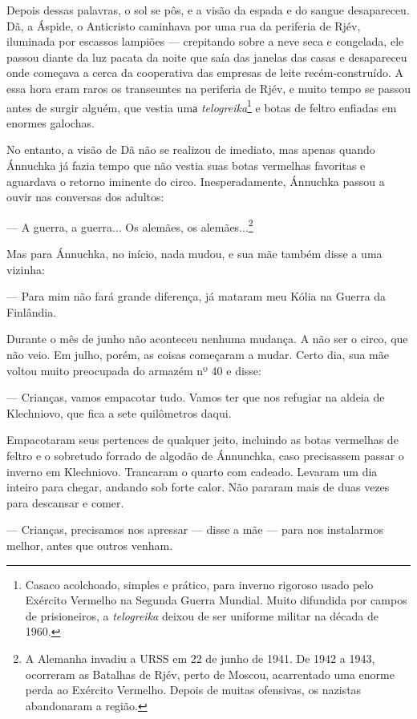 Depois dessas palavras, o sol se pôs, e a visão da espada e do sangue
desapareceu. Dã, a Áspide, o Anticristo caminhava por uma rua da
periferia de Rjév, iluminada por escassos lampiões --- crepitando sobre
a neve seca e congelada, ele passou diante da luz pacata da noite que
saía das janelas das casas e desapareceu onde começava a cerca da
cooperativa das empresas de leite recém-construído. A essa hora eram
raros os transeuntes na periferia de Rjév, e muito tempo se passou antes
de surgir alguém, que vestia umа \emph{telogreika}\footnote{Casaco
  acolchoado, simples e prático, para inverno rigoroso usado pelo
  Exército Vermelho na Segunda Guerra Mundial. Muito difundida por
  campos de prisioneiros, a \emph{telogreika} deixou de ser uniforme
  militar na década de 1960.} e botas de feltro enfiadas em enormes
galochas.

No entanto, a visão de Dã não se realizou de imediato, mas apenas quando
Ánnuchka já fazia tempo que não vestia suas botas vermelhas favoritas e
aguardava o retorno iminente do circo. Inesperadamente, Ánnuchka passou
a ouvir nas conversas dos adultos:

--- A guerra, a guerra... Os alemães, os alemães...\footnote{A Alemanha
  invadiu a URSS em 22 de junho de 1941. De 1942 a 1943, ocorreram as
  Batalhas de Rjév, perto de Moscou, acarrentado uma enorme perda ao
  Exército Vermelho. Depois de muitas ofensivas, os nazistas abandonaram
  a região.}

Mas para Ánnuchka, no início, nada mudou, e sua mãe também disse a uma
vizinha:

--- Para mim não fará grande diferença, já mataram meu Kólia na Guerra
da Finlândia.

Durante o mês de junho não aconteceu nenhuma mudança. A não ser o circo,
que não veio. Em julho, porém, as coisas começaram a mudar. Certo dia,
sua mãe voltou muito preocupada do armazém nº 40 e disse:

--- Crianças, vamos empacotar tudo. Vamos ter que nos refugiar na aldeia
de Klechniovo, que fica a sete quilômetros daqui.

Empacotaram seus pertences de qualquer jeito, incluindo as botas
vermelhas de feltro e o sobretudo forrado de algodão de Ánnunchka, caso
precisassem passar o inverno em Klechniovo. Trancaram o quarto com
cadeado. Levaram um dia inteiro para chegar, andando sob forte calor.
Não pararam mais de duas vezes para descansar e comer.

--- Crianças, precisamos nos apressar --- disse a mãe --- para nos
instalarmos melhor, antes que outros venham.

